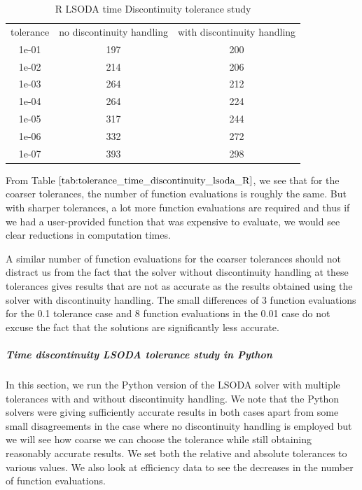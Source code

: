 \begin{table}[H]
\caption {R LSODA time Discontinuity tolerance study} \label{tab:tolerance_time_discontinuity_lsoda_R} 
\begin{center}
\begin{tabular}{ c c c }
tolerance & no discontinuity handling & with discontinuity handling \\ 
1e-01 & 197 & 200 \\
1e-02 & 214 & 206 \\
1e-03 & 264 & 212 \\
1e-04 & 264 & 224 \\
1e-05 & 317 & 244 \\
1e-06 & 332 & 272 \\
1e-07 & 393 & 298 \\
\end{tabular}
\end{center}
\end{table}

From Table $\ref{tab:tolerance_time_discontinuity_lsoda_R}$, we see that for the coarser tolerances, the number of function evaluations is roughly the same. But with sharper tolerances, a lot more function evaluations are required and thus if we had a user-provided function that was expensive to evaluate, we would see clear reductions in computation times.

A similar number of function evaluations for the coarser tolerances should not distract us from the fact that the solver without discontinuity handling at these tolerances gives results that are not as accurate as the results obtained using the solver with discontinuity handling. The small differences of 3 function evaluations for the 0.1 tolerance case and 8 function evaluations in the 0.01 case do not excuse the fact that the solutions are significantly less accurate.

\subparagraph{Time discontinuity LSODA tolerance study in Python}
In this section, we run the Python version of the LSODA solver with multiple tolerances with and without discontinuity handling. We note that the Python solvers were giving sufficiently accurate results in both cases apart from some small disagreements in the case where no discontinuity handling is employed but we will see how coarse we can choose the tolerance while still obtaining reasonably accurate results. We set both the relative and absolute tolerances to various values. We also look at efficiency data to see the decreases in the number of function evaluations.

